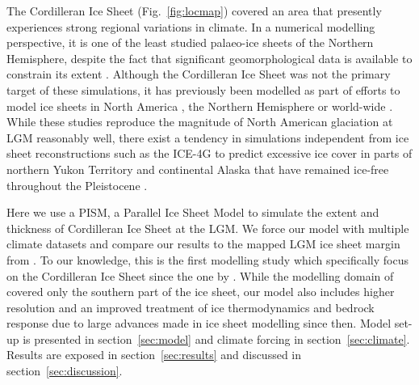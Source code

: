 The Cordilleran Ice Sheet (Fig.~\ref{fig:locmap}) covered an area that presently experiences strong regional variations in climate. In a numerical modelling perspective, it is one of the least studied palaeo-ice sheets of the Northern Hemisphere, despite the fact that significant geomorphological data is available to constrain its extent \citep{jackson-clague-1991,dukrodkin-1999,kaufman-manley-2004,kleman-etal-2010,margold-etal-2011}. Although the Cordilleran Ice Sheet was not the primary target of these simulations, it has previously been modelled as part of efforts to model ice sheets in North America \citep{marshall-clarke-1999,calov-etal-2002,tarasov-peltier-1997,tarasov-peltier-2004,gregoire-etal-2012}, the Northern Hemisphere \citep{huybrechts-tsiobbel-1996,greve-etal-1999,charbit-etal-2002,charbit-etal-2007,charbit-etal-2013,johnson-fastook-2002,rodgers-etal-2004,bintanja-etal-2005,zweck-huybrechts-2005,abeouchi-etal-2007} or world-wide \citep{yoshimori-etal-2001}. While these studies reproduce the magnitude of North American glaciation at LGM reasonably well, there exist a tendency in simulations independent from ice sheet reconstructions such as the ICE-4G to predict excessive ice cover in parts of northern Yukon Territory and continental Alaska that have remained ice-free throughout the Pleistocene \citep{dukrodkin-1999,kaufman-manley-2004}.

Here we use a PISM, a Parallel Ice Sheet Model \citep{web:pism}  to simulate the extent and thickness of Cordilleran Ice Sheet at the LGM. We force our model with multiple climate datasets and compare our results to the mapped LGM ice sheet margin from \citet{dyke-2004}. To our knowledge, this is the first modelling study which specifically focus on the Cordilleran Ice Sheet since the one by \citet{robert-1991}. While the modelling domain of \citet{robert-1991} covered only the southern part of the ice sheet, our model also includes higher resolution and an improved treatment of ice thermodynamics and bedrock response due to large advances made in ice sheet modelling since then. Model set-up is presented in section~\ref{sec:model} and climate forcing in section~\ref{sec:climate}. Results are exposed in section~\ref{sec:results} and discussed in section~\ref{sec:discussion}.
